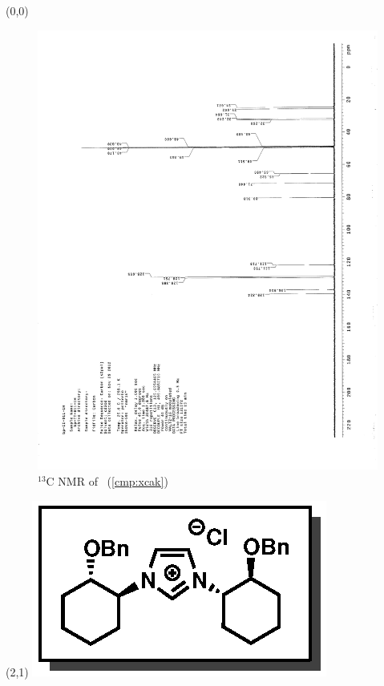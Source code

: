 \clearpage
\begin{textblock}{20}(0,0)
\begin{figure}[htb]
\caption{$^{13}$C NMR of  \CMPxcak\ (\ref{cmp:xcak})}
\includegraphics[scale=0.75, trim = 0mm 0mm 0mm 5mm,
clip]{chp_alkylation/images/nmr/xcakC}
\vspace{-100pt}
\end{figure}
\end{textblock}
\begin{textblock}{1}(2,1)
\includegraphics[scale=0.8, angle=90]{chp_alkylation/images/xcak}
\end{textblock}
\clearpage

